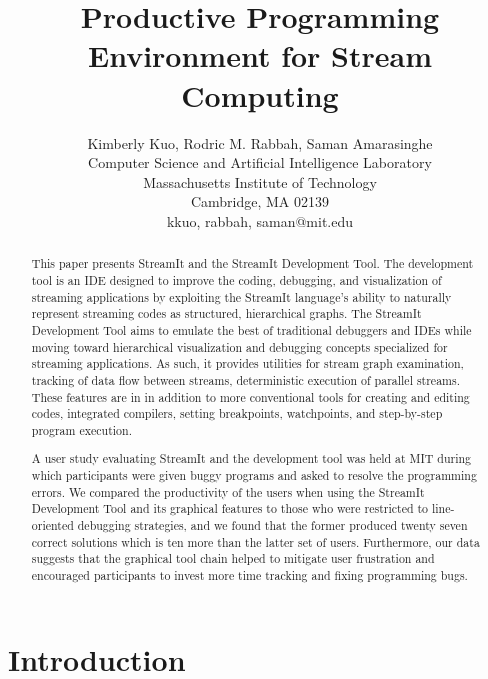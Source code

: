 \documentclass[11pt, letterpaper, onecolumn]{article}
\date{}
\title {\bf Productive Programming Environment for Stream Computing}
\author{
  Kimberly Kuo, Rodric M. Rabbah, Saman Amarasinghe\\
  Computer Science and Artificial Intelligence Laboratory\\
  Massachusetts Institute of Technology\\
  Cambridge, MA 02139\\
  {kkuo, rabbah, saman}@mit.edu
}
\begin{document}
\maketitle

\singlespacing
\begin{abstract}
This paper  presents StreamIt and  the StreamIt Development  Tool. The
development tool is an IDE  designed to improve the coding, debugging,
and visualization of streaming applications by exploiting the StreamIt
language's   ability  to  naturally   represent  streaming   codes  as
structured, hierarchical  graphs.  The StreamIt  Development Tool aims
to emulate  the best  of traditional debuggers  and IDEs  while moving
toward hierarchical  visualization and debugging  concepts specialized
for streaming applications.  As such, it provides utilities for stream
graph   examination,   tracking   of   data  flow   between   streams,
deterministic execution of parallel  streams. These features are in in
addition to  more conventional tools  for creating and  editing codes,
integrated   compilers,    setting   breakpoints,   watchpoints,   and
step-by-step program execution.

A user study evaluating StreamIt  and the development tool was held at
MIT during which  participants were given buggy programs  and asked to
resolve the  programming errors.  We compared the  productivity of the
users  when  using the  StreamIt  Development  Tool  and its  graphical
features  to  those who  were  restricted  to line-oriented  debugging
strategies, and we found that the former produced twenty seven correct
solutions which is ten more than the latter set of users. Furthermore,
our data suggests that the graphical tool chain helped to mitigate user
frustration and  encouraged participants to invest  more time tracking
and fixing programming bugs.
\end{abstract}

\doublespacing


\section{Introduction}
\end{document}
